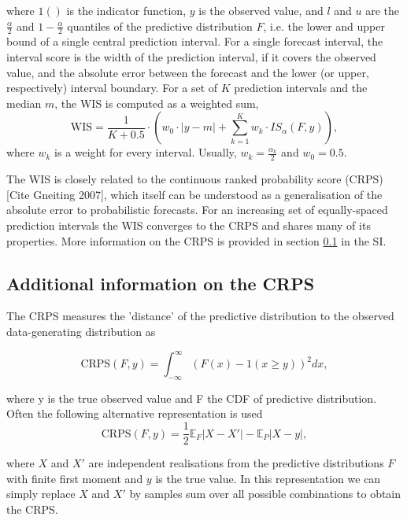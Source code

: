 \documentclass{article}
\begin{document}
where $1()$ is the indicator function, $y$ is the observed value, and $l$ and $u$ are the $\frac{\alpha}{2}$ and $1 - \frac{\alpha}{2}$ quantiles of the predictive distribution $F$, i.e. the lower and upper bound of a single central prediction interval. For a single forecast interval, the interval score is the width of the prediction interval, if it covers the observed value, and the absolute error between the forecast and the lower (or upper, respectively) interval boundary. For a set of $K$ prediction intervals and the median $m$, the WIS is computed as a weighted sum, 
\begin{equation}
\text{WIS} = \frac{1}{K + 0.5} \cdot \left(w_0 \cdot |y - m| + \sum_{k = 1}^{K} w_k \cdot IS_{\alpha}(F, y)\right),    
\end{equation} 
where $w_k$ is a weight for every interval. Usually, $w_k = \frac{\alpha_k}{2}$ and $w_0 = 0.5$. 


The WIS is closely related to the continuous ranked probability score (CRPS) [Cite Gneiting 2007], which itself can be understood as a generalisation of the absolute error to probabilistic forecasts. For an increasing set of equally-spaced prediction intervals the WIS converges to the CRPS and shares many of its properties. More information on the CRPS is provided in section \ref{crps} in the SI. 

\subsection{Additional information on the CRPS} \label{crps}

The CRPS measures the 'distance' of the predictive distribution to the observed data-generating distribution as 

\begin{equation}
    \text{CRPS}(F, y) = \int_{-\infty}^\infty \left( F(x) - 1(x \geq y) \right)^2 dx,
\end{equation}

where y is the true observed value and F the CDF of predictive distribution. Often the following alternative representation is used
\begin{equation}
    \text{CRPS}(F, y) = \frac{1}{2} \mathbb{E}_{F} |X - X'| - \mathbb{E}_P |X - y|,
\end{equation}
  
where $X$ and $X'$ are independent realisations from the predictive distributions $F$ with finite first moment and $y$ is the true value. In this representation we can simply replace $X$ and $X'$ by samples sum over all possible combinations to obtain the CRPS.  
\end{document}
